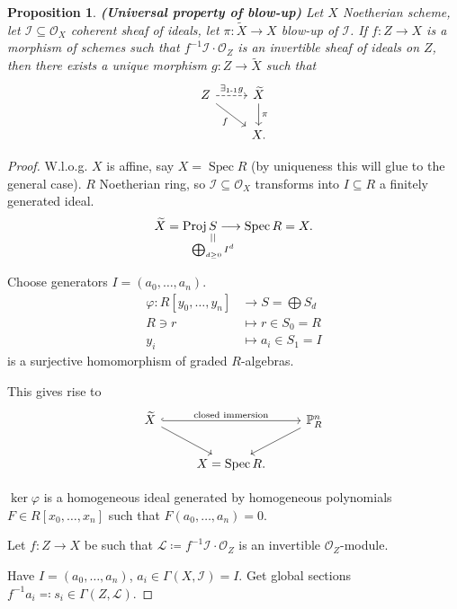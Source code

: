 \documentclass[12pt]{article}
\DeclareMathOperator{\Spec}{Spec}
\DeclareMathOperator{\Proj}{Proj}
\newtheorem*{proposition}{Proposition}
\theoremstyle{definition}
\begin{document}
\begin{proposition}
\emph{\textbf{(Universal property of blow-up)}} Let $X$ Noetherian scheme, let $\mathcal{I}\subseteq\mathcal{O}_X$ coherent sheaf of ideals, let $\pi:\widetilde{X}\rightarrow X$ blow-up of $\mathcal{I}$. If $f:Z\rightarrow X$ is a morphism of schemes such that $f^{-1}\mathcal{I}\cdot\mathcal{O}_Z$ is an invertible sheaf of ideals on $Z$, then there exists a unique morphism $g:Z\rightarrow\widetilde{X}$ such that
\[
\begin{tikzcd}
Z\arrow[r,dashed,"\exists_{1\text{-}1}g"]\arrow[rd,"f",swap]&\widetilde{X}\arrow[d,"\pi"]\\
&X.
\end{tikzcd}
\]
\end{proposition}

\begin{proof}
W.l.o.g. $X$ is affine, say $X=\Spec R$ (by uniqueness this will glue to the general case). $R$ Noetherian ring, so $\mathcal{I}\subseteq\mathcal{O}_X$ transforms into $I\subseteq R$ a finitely generated ideal.
\[\widetilde{X}=\Proj\underset{\mathclap{\substack{\\||\\\bigoplus_{d\geq0}I^d}}}{S}\longrightarrow\Spec R=X.\]

Choose generators $I=(a_0,\ldots,a_n)$.
\begin{align*}
\varphi:R[y_0,\ldots,y_n]&\longrightarrow S=\bigoplus S_d\\
R\ni r&\longmapsto r\in S_0=R\\
y_i&\longmapsto a_i\in S_1=I
\end{align*}
is a surjective homomorphism of graded $R$-algebras.

This gives rise to
\[
\begin{tikzcd}
\widetilde{X}\arrow[rr,hook,"\text{closed immersion}"]\arrow[rd]&&\mathbb{P}_R^n\arrow[ld]\\
&X=\Spec R.
\end{tikzcd}
\]

$\ker\varphi$ is a homogeneous ideal generated by homogeneous polynomials $F\in R[x_0,\ldots,x_n]$ such that $F(a_0,\ldots,a_n)=0$.

Let $f:Z\rightarrow X$ be such that $\mathcal{L}\coloneqq f^{-1}\mathcal{I}\cdot\mathcal{O}_Z$ is an invertible $\mathcal{O}_Z$-module.

Have $I=(a_0,\ldots,a_n)$, $a_i\in\Gamma(X,\mathcal{I})=I$. Get global sections $f^{-1}a_i\eqqcolon s_i\in\Gamma(Z,\mathcal{L})$.


\end{proof}
\end{document}
